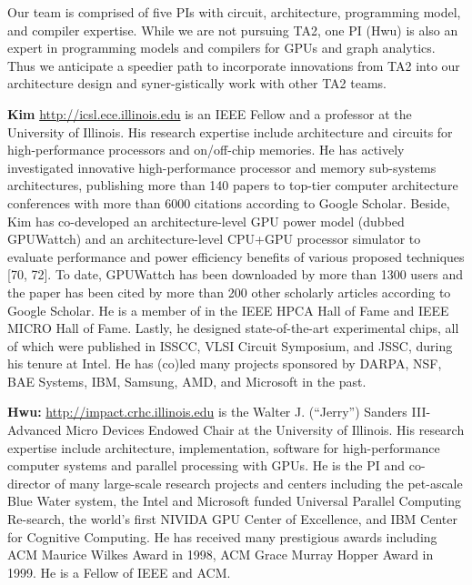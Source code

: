 Our team is comprised of five PIs with circuit, architecture, programming model, and compiler expertise. 
While we are not pursuing TA2, one PI (Hwu) is also an expert in programming models and compilers for GPUs and graph analytics. 
Thus we anticipate a speedier path to incorporate innovations from TA2 into our architecture design and syner-gistically work with other TA2 teams.

\noindent
\textbf{Kim} \url{http://icsl.ece.illinois.edu} is an IEEE Fellow and a professor at the University of Illinois. 
His research expertise include architecture and circuits for high-performance processors and on/off-chip memories. 
He has actively investigated innovative high-performance processor and memory sub-systems architectures, publishing more than 140 papers to top-tier computer architecture conferences with more than 6000 citations according to Google Scholar. 
Beside, Kim has co-developed an architecture-level GPU power model (dubbed GPUWattch) and an architecture-level CPU+GPU processor simulator to evaluate performance and power efficiency benefits of various proposed techniques [70, 72]. 
To date, GPUWattch has been downloaded by more than 1300 users and the paper has been cited by more than 200 other scholarly articles according to Google Scholar. 
He is a member of in the IEEE HPCA Hall of Fame and IEEE MICRO Hall of Fame. Lastly, he designed state-of-the-art experimental chips, all of which were published in ISSCC, VLSI Circuit Symposium, and JSSC, during his tenure at Intel.
He has (co)led many projects sponsored by DARPA, NSF, BAE Systems, IBM, Samsung, AMD, and Microsoft in the past. 

\noindent
\textbf{Hwu:} \url{http://impact.crhc.illinois.edu} is the Walter J. (``Jerry'') Sanders III-Advanced Micro Devices Endowed Chair at the University of Illinois. 
His research expertise include architecture, implementation, software for high-performance computer systems and parallel processing with GPUs. 
He is the PI and co-director of many large-scale research projects and centers including the pet-ascale Blue Water system, the Intel and Microsoft funded Universal Parallel Computing Re-search, the world’s first NIVIDA GPU Center of Excellence, and IBM Center for Cognitive Computing. 
He has received many prestigious awards including ACM Maurice Wilkes Award in 1998, ACM Grace Murray Hopper Award in 1999. He is a Fellow of IEEE and ACM.

